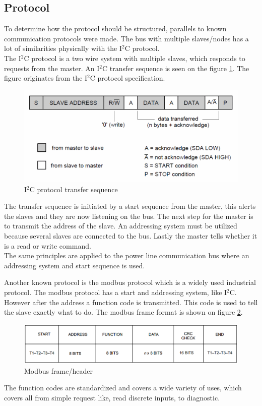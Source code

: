 \subsection{Protocol}
To determine how the protocol should be structured, parallels to known communication protocols were made. The bus with multiple slaves/nodes has a lot of similarities physically with the I$^2$C protocol.\\
The I$^2$C protocol is a two wire system with multiple slaves, which responds to requests from the master. An I$^2$C transfer sequence is seen on the figure \ref{fig:i2cheader}. The figure originates from the I$^2$C protocol specification\cite{I2CInfo}.
\begin{figure}[H]
	\centering
	\includegraphics[width=.8\textwidth]{billeder/10technologystudies/7-bit-address-writing}
	\caption{I$^2$C protocol transfer sequence}
	\label{fig:i2cheader}
\end{figure}
The transfer sequence is initiated by a start sequence from the master, this alerts the slaves and they are now listening on the bus. The next step for the master is to transmit the address of the slave. An addressing system must be utilized because several slaves are connected to the bus. Lastly the master tells whether it is a read or write command. \\
The same principles are applied to the power line communication bus where an addressing system and start sequence is used.

Another known protocol is the modbus protocol which is a widely used industrial protocol. The modbus protocol has a start and addressing system, like I$^2$C. However after the address a function code is transmitted. This code is used to tell the slave exactly what to do. The modbus frame format is shown on figure \ref{fig:modbusframe}.
\begin{figure}[H]
	\centering
	\includegraphics[width=.8\textwidth]{billeder/10technologystudies/modbusframe}
	\caption{Modbus frame/header}
	\label{fig:modbusframe}
\end{figure}
The function codes are standardized and covers a wide variety of uses, which covers all from simple request like, read discrete inputs, to diagnostic.
